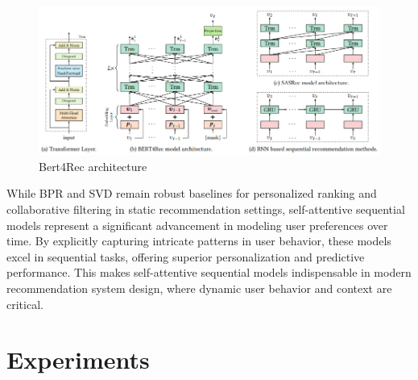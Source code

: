 \documentclass{article}
\begin{document}
\begin{figure}
    \centering
    \includegraphics[width=1.1\linewidth]{DSC210_Project_Report/images/bert4rec.png}
    \caption{Bert4Rec architecture}
    \label{fig:mf}
\end{figure}
While BPR and SVD remain robust baselines for personalized ranking and collaborative filtering in static recommendation settings, self-attentive sequential models represent a significant advancement in modeling user preferences over time. By explicitly capturing intricate patterns in user behavior, these models excel in sequential tasks, offering superior personalization and predictive performance. This makes self-attentive sequential models indispensable in modern recommendation system design, where dynamic user behavior and context are critical.



\section{Experiments}
\end{document}
